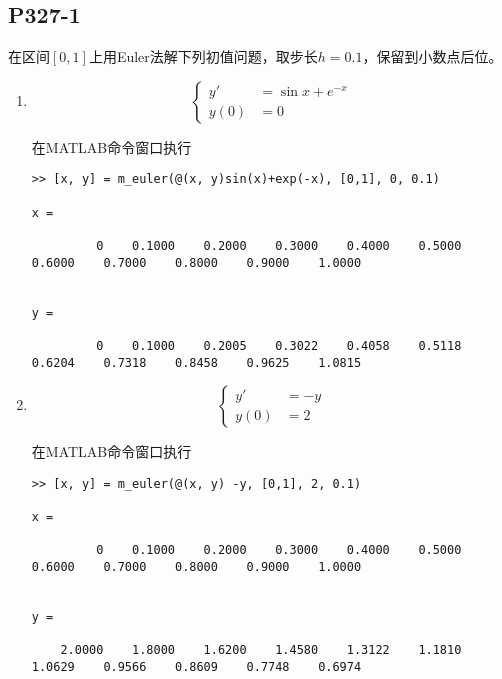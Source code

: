\subsection{P327-1}
在区间$[0, 1]$上用Euler法解下列初值问题，取步长$h=0.1$，保留到小数点后位。

\begin{enumerate}
\item
\begin{equation*}
\begin{cases}
y' & = \sin x + e ^ {-x} \\
y(0) & = 0
\end{cases}
\end{equation*}

\begin{SOLVE}
在MATLAB命令窗口执行
\begin{lstlisting}
>> [x, y] = m_euler(@(x, y)sin(x)+exp(-x), [0,1], 0, 0.1)

x =

         0    0.1000    0.2000    0.3000    0.4000    0.5000    0.6000    0.7000    0.8000    0.9000    1.0000


y =

         0    0.1000    0.2005    0.3022    0.4058    0.5118    0.6204    0.7318    0.8458    0.9625    1.0815

\end{lstlisting}
\end{SOLVE}
\item
\begin{equation*}
\begin{cases}
y' & = -y \\
y(0) & = 2
\end{cases}
\end{equation*}

\begin{SOLVE}
在MATLAB命令窗口执行
\begin{lstlisting}
>> [x, y] = m_euler(@(x, y) -y, [0,1], 2, 0.1)

x =

         0    0.1000    0.2000    0.3000    0.4000    0.5000    0.6000    0.7000    0.8000    0.9000    1.0000


y =

    2.0000    1.8000    1.6200    1.4580    1.3122    1.1810    1.0629    0.9566    0.8609    0.7748    0.6974

\end{lstlisting}
\end{SOLVE}
\end{enumerate}